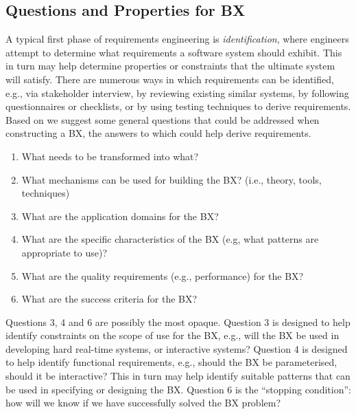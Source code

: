 \subsection{Questions and Properties for BX}
A typical first phase of requirements engineering is \textit{identification}, where engineers attempt to determine what requirements a software system should exhibit. This in turn may help determine properties or constraints that the ultimate system will satisfy. There are numerous ways in which requirements can be identified, e.g., via stakeholder interview, by reviewing existing similar systems, by following questionnaires or checklists, or by using testing techniques to derive requirements. Based on \cite{TehraniZL16} we suggest some general questions that could be addressed when constructing a BX, the answers to which could help derive requirements.

\begin{enumerate}
\item What needs to be transformed into what?
\item What mechanisms can be used for building the BX? (i.e., theory, tools, techniques)
\item What are the application domains for the BX?
\item What are the specific characteristics of the BX (e.g, what patterns are appropriate to use)?
\item What are the quality requirements (e.g., performance) for the BX?
\item What are the success criteria for the BX?
\end{enumerate}
Questions 3, 4 and 6 are possibly the most opaque. Question 3 is designed to help identify constraints on the scope of use for the BX, e.g., will the BX be used in developing hard real-time systems, or interactive systems? Question 4 is designed to help identify functional requirements, e.g., should the BX be parameterised, should it be interactive? This in turn may help identify suitable patterns that can be used in specifying or designing the BX. Question 6 is the ``stopping condition'': how will we know if we have successfully solved the BX problem?

